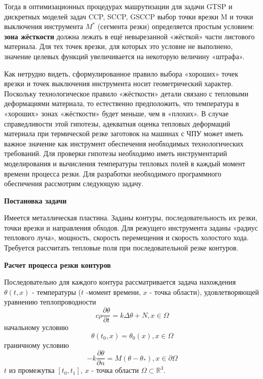 \documentclass[12pt]{report}
\begin{document}
Тогда в оптимизационных процедурах машрутизации
для задачи GTSP  и дискретных моделей задач CCP, SCCP, GSCCP
выбор точки врезки M и точки выключения инструмента $M^*$
(сегмента резки) определяется простым условием:
{\bf зона жёсткости} должна лежать в ещё невырезанной
«жёсткой» части листового материала.
Для тех точек врезки, для которых это условие не выполнено,
значение целевых функций  увеличивается на некоторую величину «штрафа».

Как нетрудно видеть,
сформулированное правило выбора «хороших» точек врезки
и точек выключения инструмента носит геометрический характер.
Поскольку технологическое правило «жёсткости» детали
связано с тепловыми деформациями материала,
то естественно предположить,
что температура в «хороших» зонах «жёсткости» будет меньше,
чем в «плохих».
В случае справедливости этой гипотезы,
адекватная оценка тепловых деформаций материала
при термической резке заготовок на машинах с ЧПУ
может иметь важное значение как инструмент
обеспечения необходимых технологических требований.
Для проверки гипотезы необходимо иметь инструментарий
моделирования и вычисления температуры тепловых полей в
каждый момент времени процесса резки.
Для разработки необходимого программного
обеспечения рассмотрим следующую задачу.

{\bf Постановка задачи}

Имеется металлическая пластина.
Заданы контуры, последовательность их резки,
точки врезки и направления обходов.
Для режущего инструмента заданы «радиус теплового луча»,
мощность, скорость перемещения и скорость холостого хода.
Требуется рассчитать тепловые поля при
последовательной резке контуров.

{\bf Расчет процесса резки контуров}

Последовательно для каждого контура рассматривается задача нахождения
$\theta(t, x)$ - температуры
($t$ -момент времени,
$x$ - точка области), удовлетворяющей уравнению теплопроводности
\begin{equation}
c \rho \frac{\partial \theta}{\partial t}=k \Delta \theta +N, x \in \Omega
\end{equation}
начальному условию
\begin{equation}
  \theta(t_0, x)=\theta_0(x), x \in \Omega
\end{equation}
граничному условию
\begin{equation}
  -k \frac{\partial \theta}{\partial n}=M(\theta - \theta_*), x \in \partial \Omega
\end{equation}
$t$ из промежутка $[t_0, t_1]$,
$x$ - точка области
$\Omega \subset \mathbb R^3$.
\end{document}
